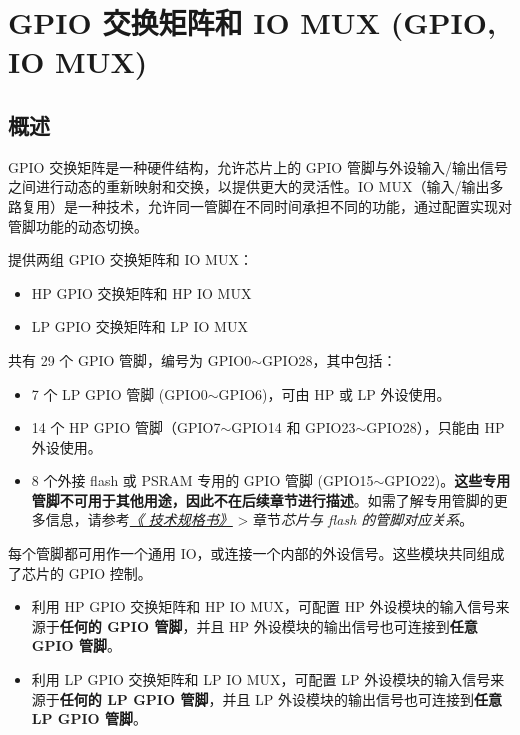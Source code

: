 \documentclass[main\_\_CN.tex]{subfiles}
\begin{document}

\ifglobal
\else
    \listoftodos
    {\let\clearpage\relax \listofdonetodos}
    \tableofcontents
\fi


\hypertarget{iomuxgpio}{}
\chapter{GPIO 交换矩阵和 IO MUX (GPIO, IO MUX)}
\label{mod:iomuxgpio}
\section{概述}

GPIO 交换矩阵是一种硬件结构，允许芯片上的 GPIO 管脚与外设输入/输出信号之间进行动态的重新映射和交换，以提供更大的灵活性。IO MUX（输入/输出多路复用）是一种技术，允许同一管脚在不同时间承担不同的功能，通过配置实现对管脚功能的动态切换。

\chipname{} 提供两组 GPIO 交换矩阵和 IO MUX：
\begin{itemize}
    \item HP GPIO 交换矩阵和 HP IO MUX
    \item LP GPIO 交换矩阵和 LP IO MUX
\end{itemize}

\chipname{} 共有 29 个 GPIO 管脚，编号为 GPIO0$\sim$GPIO28，其中包括：
\begin{itemize}
    \item 7 个 LP GPIO 管脚 (GPIO0$\sim$GPIO6)，可由 HP 或 LP 外设使用。
    \item 14 个 HP GPIO 管脚（GPIO7$\sim$GPIO14 和 GPIO23$\sim$GPIO28），只能由 HP 外设使用。
    \item 8 个外接 flash 或 PSRAM 专用的 GPIO 管脚 (GPIO15$\sim$GPIO22)。\textbf{这些专用管脚不可用于其他用途，因此不在后续章节进行描述}。如需了解专用管脚的更多信息，请参考\textit{\href{https://www.espressif.com/sites/default/files/documentation/esp32-c5_datasheet_cn.pdf}{《\chipname{} 技术规格书》}} > 章节\textit{芯片与 flash 的管脚对应关系}。
\end{itemize}
每个管脚都可用作一个通用 IO，或连接一个内部的外设信号。这些模块共同组成了芯片的 GPIO 控制。
\begin{itemize}
    \item 利用 HP GPIO 交换矩阵和 HP IO MUX，可配置 HP 外设模块的输入信号来源于\textbf{任何的 GPIO 管脚}，并且 HP 外设模块的输出信号也可连接到\textbf{任意 GPIO 管脚}。
    \item 利用 LP GPIO 交换矩阵和 LP IO MUX，可配置 LP 外设模块的输入信号来源于\textbf{任何的 LP GPIO 管脚}，并且 LP 外设模块的输出信号也可连接到\textbf{任意 LP GPIO 管脚}。
\end{itemize}
\end{document}

